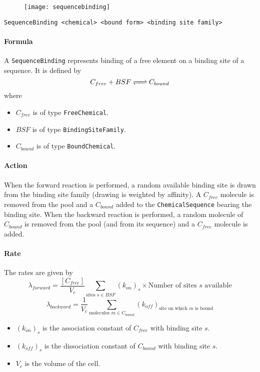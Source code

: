 \begin{figure}[!ht]
	\centering
	\texttt{[image: sequencebinding]}
\end{figure}

\begin{verbatim}
SequenceBinding <chemical> <bound form> <binding site family>
\end{verbatim}

\paragraph{Formula} A \texttt{SequenceBinding} represents binding of a free element on a binding site of a sequence. It is defined by
\[
	\reactionRev{C_{free} + BSF}{C_{bound}}{}{}
\]
where
\begin{itemize}
	\item $C_{free}$ is of type \texttt{FreeChemical}.
	\item $BSF$ is of type \texttt{BindingSiteFamily}.
	\item $C_{bound}$ is of type \texttt{BoundChemical}.
\end{itemize}

\paragraph{Action} When the forward reaction is performed, a random available binding site is drawn from the binding site family (drawing is weighted by affinity). A $C_{free}$ molecule is removed from the pool and a $C_{bound}$ added to the \texttt{ChemicalSequence} bearing the binding site. When the backward reaction is performed, a random molecule of $C_{bound}$ is removed from the pool (and from its sequence) and a $C_{free}$ molecule is added.

\paragraph{Rate} The rates are given by
\[
	\lambda_{forward} = \frac{[C_{free}]}{V_c} \sum_{\text{sites }s \in BSF} (k_{on})_s \times \text{Number of sites $s$ available}
\] 
\[
	\lambda_{backward} = \frac{1}{V_c} \sum_{\text{molecules }m \in C_{bound}} (k_{off})_\text{site on which $m$ is bound}
\]
\begin{itemize}
	\item $(k_{on})_s$ is the association constant of $C_{free}$ with binding site $s$.
	\item $(k_{off})_s$ is the dissociation constant of $C_{bound}$ with binding site $s$.
	\item $V_c$ is the volume of the cell.
\end{itemize}

